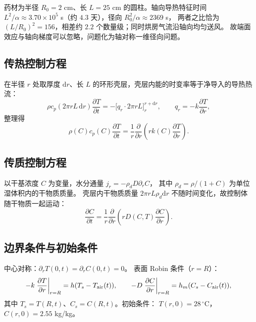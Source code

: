 \documentclass[withoutpreface,bwprint]{cumcmthesis}
\begin{document}
药材为半径 $R_0=2$ cm、长 $L=25$ cm 的圆柱。轴向导热特征时间
$L^2/\alpha\approx3.70\times10^5$ s（约 $4.3$ 天），径向 $R_0^2/\alpha\approx2369$ s，
两者之比恰为 $(L/R_0)^2=156$，相差约 $2.2$ 个数量级；同时烘房气流沿轴向均匀送风。
故端面效应与轴向梯度可以忽略，问题化为轴对称一维径向问题。

\subsection{传热控制方程}

在半径 $r$ 处取厚度 $\mathrm{d}r$、长 $L$ 的环形壳层，壳层内能的时变率等于净导入的导热热流：
\begin{equation}
\rho c_p(2\pi rL\,\mathrm{d}r)\frac{\partial T}{\partial t}
=-\big[q_r\cdot2\pi rL\big]_r^{r+\mathrm{d}r},\qquad q_r=-k\frac{\partial T}{\partial r},
\end{equation}
整理得
\begin{equation}
\rho(C)c_p(C)\frac{\partial T}{\partial t}
=\frac{1}{r}\frac{\partial}{\partial r}\left(rk(C)\frac{\partial T}{\partial r}\right).
\label{eq:energy}
\end{equation}

\subsection{传质控制方程}

以干基浓度 $C$ 为变量，水分通量 $j_r=-\rho_dD\partial_rC$，
其中 $\rho_d=\rho/(1+C)$ 为单位湿体积内的干物质质量。
壳层内干物质质量 $2\pi rL\rho_d\mathrm{d}r$ 不随时间变化，故控制体随干物质一起运动：
\begin{equation}
\frac{\partial C}{\partial t}
=\frac{1}{r}\frac{\partial}{\partial r}\left(rD(C,T)\frac{\partial C}{\partial r}\right).
\label{eq:mass}
\end{equation}

\subsection{边界条件与初始条件}

中心对称：$\partial_rT(0,t)=\partial_rC(0,t)=0$。
表面 Robin 条件（$r=R$）：
\begin{equation}
-k\left.\frac{\partial T}{\partial r}\right|_{r=R}=h(T_s-T_{\rm air}(t)),
\qquad
-D\left.\frac{\partial C}{\partial r}\right|_{r=R}=h_m(C_s-C_{\rm air}(t)),
\label{eq:robin}
\end{equation}
其中 $T_s=T(R,t)$、$C_s=C(R,t)$。初始条件：
$T(r,0)=28\,^\circ$C，$C(r,0)=2.55$ kg/kg。
\end{document}
